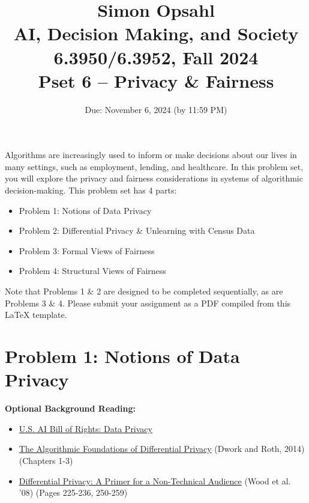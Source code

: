 \documentclass{article}
\title{\textbf{Simon Opsahl}\\AI, Decision Making, and Society\\6.3950/6.3952, Fall 2024\\Pset 6 -- Privacy \& Fairness}
\begin{document}
\date{Due: November 6, 2024 (by 11:59 PM)}

\maketitle

\section*{}

Algorithms are increasingly used to inform or make decisions about our lives in many settings, such as employment, lending, and healthcare. In this problem set, you will explore the privacy and fairness considerations in systems of algorithmic decision-making. This problem set has 4 parts:
\begin{itemize}
    \item Problem 1: Notions of Data Privacy
    \item Problem 2: Differential Privacy \& Unlearning with Census Data
    \item Problem 3: Formal Views of Fairness 
    \item Problem 4: Structural Views of Fairness
\end{itemize}

Note that Problems 1 \& 2 are designed to be completed sequentially, as are Problems 3 \& 4. Please submit your assignment as a PDF compiled from this LaTeX template.

\clearpage
\section*{Problem 1: Notions of Data Privacy}

\textbf{Optional Background Reading:}
\begin{itemize}

\item \href{https://www.whitehouse.gov/ostp/ai-bill-of-rights/data-privacy-2/}{U.S. AI Bill of Rights: Data Privacy}

\item \href{https://www.cis.upenn.edu/~aaroth/Papers/privacybook.pdf}{The Algorithmic Foundations of Differential Privacy} (Dwork and Roth, 2014) (Chapters 1-3)
\item \href{https://salil.seas.harvard.edu/sites/scholar.harvard.edu/files/salil/files/differential_privacy_primer_nontechnical_audience.pdf}{Differential Privacy:
A Primer for a Non-Technical
Audience} (Wood et al. '08) (Pages 225-236, 250-259)
\end{itemize}
\bigskip 
\end{document}
